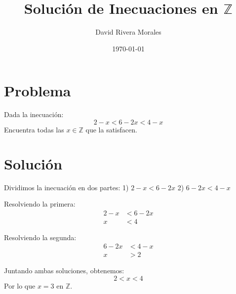 \documentclass[12pt]{article}
\begin{document}
\title{Solución de Inecuaciones en \( \mathbb{Z} \)}
\author{David Rivera Morales}
\date{\today}

\maketitle

\section*{Problema}
Dada la inecuación:
\[
2 - x < 6 - 2x < 4 - x
\]
Encuentra todas las \( x \in \mathbb{Z} \) que la satisfacen.

\section*{Solución}
Dividimos la inecuación en dos partes:
1) \(2 - x < 6 - 2x\)
2) \(6 - 2x < 4 - x\)

Resolviendo la primera:
\begin{align*}
2 - x &< 6 - 2x \\
x &< 4
\end{align*}

Resolviendo la segunda:
\begin{align*}
6 - 2x &< 4 - x \\
x &> 2
\end{align*}

Juntando ambas soluciones, obtenemos:
\[
2 < x < 4
\]
Por lo que \(x = 3\) en \(\mathbb{Z}\).
\end{document}
